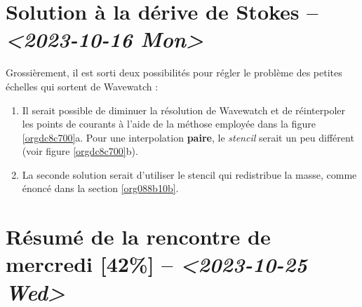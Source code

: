 \documentclass[10pt]{article}
\numberwithin{equation}{section}
\begin{document}
\section{Solution à la dérive de Stokes -- \textit{<2023-10-16 Mon>}}
\label{sec:orgeb482b5}
Grossièrement, il est sorti deux possibilités pour régler le problème des petites échelles qui sortent de Wavewatch :
\begin{enumerate}
\item Il serait possible de diminuer la résolution de Wavewatch et de réinterpoler les points de courants à l'aide de la méthose employée dans la figure \ref{orgdc8c700}a.
Pour une interpolation \textbf{paire}, le \emph{stencil} serait un peu différent (voir figure \ref{orgdc8c700}b).

\item La seconde solution serait d'utiliser le stencil qui redistribue la masse, comme énoncé dans la section \ref{org088b10b}.
\end{enumerate}

\section{Résumé de la rencontre de mercredi [42\%]  -- \textit{<2023-10-25 Wed>}}
\label{sec:org3199868}
\end{document}
